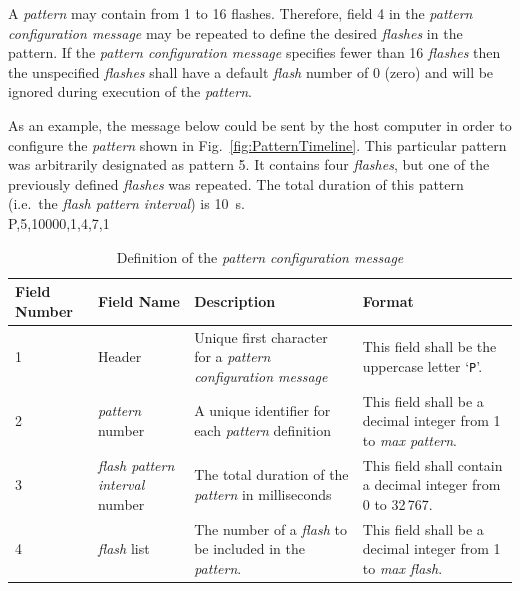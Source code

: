 \documentclass[letterpaper,11pt]{article}
\begin{document}
A \textit{pattern} may contain from 1 to 16 flashes. Therefore, field 4 in the
\textit{pattern configuration message} may be repeated to define
the desired \textit{flashes} in the pattern. If the \textit{pattern
configuration message} specifies fewer than 16 \textit{flashes} then the
unspecified \textit{flashes} shall have a default \textit{flash} number of 0
(zero) and will be ignored during execution of the \textit{pattern}.

As an example, the message below could be sent by the host computer in
order to configure the \textit{pattern} shown in Fig.\
\ref{fig:PatternTimeline}. This particular pattern was arbitrarily designated
as pattern 5. It contains four \textit{flashes}, but one of the previously
defined \textit{flashes} was repeated. The total duration of this pattern
(i.e.\ the \textit{flash pattern interval}) is \SI{10}{\second}.\\[12pt]
{\ttfamily
P,5,10000,1,4,7,1\\
}

\begin{table}[H]
\centering
\caption{Definition of the \textit{pattern configuration message}}
\label{tab:PatternConfig}
\setlength\extrarowheight{2pt}
\begin{tabular}[h]{|p{0.5in}|p{1.00in}|p{2.25in}|p{2.25in}|} \hline
Field Number & Field Name & Description & Format \\ \hline
1            & Header
             & Unique first character for a \textit{pattern configuration
             message}
             & This field shall be the uppercase letter `\texttt{P}'.
             \\ \hline
2            & \textit{pattern} number
             & A unique identifier for each \textit{pattern} definition
             & This field shall be a decimal integer from 1 to \textit{max
             pattern}.
             \\ \hline
3            & \textit{flash pattern interval} number
             & The total duration of the \textit{pattern} in milliseconds
             & This field shall contain a decimal integer from 0 to 32\,767.
             \\ \hline
4            & \textit{flash} list
             & The number of a \textit{flash} to be included in the
             \textit{pattern}.
             & This field shall be a decimal integer from 1 to \textit{max
             flash}.
             \\ \hline
\end{tabular}
\end{table}
\end{document}

